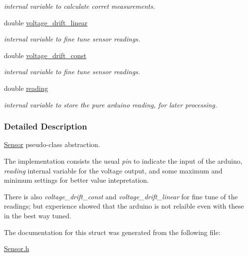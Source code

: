 \begin{DoxyCompactItemize}
\begin{DoxyCompactList}\small\item\em internal variable to calculate corret measurements. \end{DoxyCompactList}\item 
\hypertarget{struct_sensor_a1b2bf343b68a94912d8d37a5e5310341}{double \hyperlink{struct_sensor_a1b2bf343b68a94912d8d37a5e5310341}{voltage\+\_\+drift\+\_\+linear}}\label{struct_sensor_a1b2bf343b68a94912d8d37a5e5310341}

\begin{DoxyCompactList}\small\item\em internal variable to fine tune sensor readings. \end{DoxyCompactList}\item 
\hypertarget{struct_sensor_a17960d4f81c9c2ba5da80f01e9865f32}{double \hyperlink{struct_sensor_a17960d4f81c9c2ba5da80f01e9865f32}{voltage\+\_\+drift\+\_\+const}}\label{struct_sensor_a17960d4f81c9c2ba5da80f01e9865f32}

\begin{DoxyCompactList}\small\item\em internal variable to fine tune sensor readings. \end{DoxyCompactList}\item 
\hypertarget{struct_sensor_a38cfe187d7cb2e43a8618a162ad795f4}{double \hyperlink{struct_sensor_a38cfe187d7cb2e43a8618a162ad795f4}{reading}}\label{struct_sensor_a38cfe187d7cb2e43a8618a162ad795f4}

\begin{DoxyCompactList}\small\item\em internal variable to store the pure arduino reading, for later processing. \end{DoxyCompactList}\end{DoxyCompactItemize}


\subsubsection{Detailed Description}
\hyperlink{struct_sensor}{Sensor} pseudo-\/class abstraction.

The implementation consists the usual {\itshape pin} to indicate the input of the arduino, {\itshape reading} internal variable for the voltage output, and some maximum and minimum settings for better value intepretation.

There is also {\itshape voltage\+\_\+drift\+\_\+const} and {\itshape voltage\+\_\+drift\+\_\+linear} for fine tune of the readings; but experience showed that the arduino is not relaible even with these in the best way tuned. 

The documentation for this struct was generated from the following file\+:\begin{DoxyCompactItemize}
\item 
\hyperlink{_sensor_8h}{Sensor.\+h}\end{DoxyCompactItemize}
